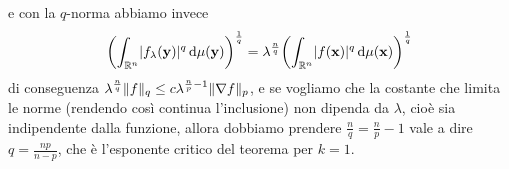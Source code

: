 e con la $q$-norma abbiamo invece
\begin{equation}
    \biggl(\int_{\mathbb{R}^n}\lvert f_\lambda(\mathbf{y})\rvert^q\,\textup{d}\mu(\mathbf{y})\biggr)^\frac1{q}=
    \lambda^\frac{n}{q}\biggl(\int_{\mathbb{R}^n}\lvert f(\mathbf{x})\rvert^q\,\textup{d}\mu(\mathbf{x})\biggr)^\frac1{q}
\end{equation}
di conseguenza $\lambda^\frac{n}{q}\lVert f\rVert_q\le c\lambda^{\frac{n}{p}-1}\lVert\nabla f\rVert_p$, e se vogliamo che la costante che limita le norme (rendendo cos\`i continua l'inclusione) non dipenda da $\lambda$, cioè sia indipendente dalla funzione, allora dobbiamo prendere $\frac{n}{q}=\frac{n}{p}-1$ vale a dire $q=\frac{np}{n-p}$, che è l'esponente critico del teorema per $k=1$.
